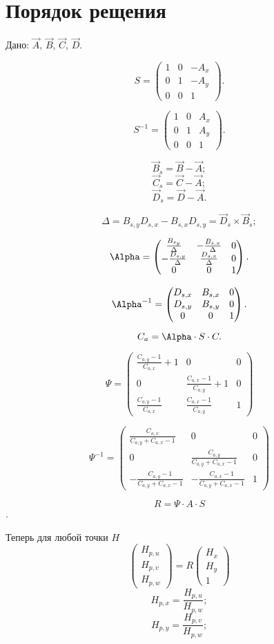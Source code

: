 \section{Порядок рещения}

Дано: $\vec A$, $\vec B$, $\vec C$, $\vec D$.

$$S = \begin{pmatrix}
	1 & 0 & -A_x \\
	0 & 1 & -A_y \\
	0 & 0 & 1
\end{pmatrix}.$$

$$S^{-1} = \begin{pmatrix}
	1 & 0 & A_x \\
	0 & 1 & A_y \\
	0 & 0 & 1
\end{pmatrix}.$$

$$\vec B_s = \vec B - \vec A;$$
$$\vec C_s = \vec C - \vec A;$$
$$\vec D_s = \vec D - \vec A.$$

$$ \Delta = B_{s,y} D_{s,x}-B_{s,x} D_{s,y} = \vec D_s \times \vec B_s;$$

$$	\Alpha = 
	\begin{pmatrix}
		\frac{B_{s_y}}{\Delta} & -\frac{B_{s,x}}{\Delta} & 0 \\
		-\frac{D_{s,y}}{\Delta} & \frac{D_{s,x}}{\Delta} & 0 \\
		0 & 0 & 1
	\end{pmatrix}.
$$

$$ \Alpha^{-1} =
\begin{pmatrix}
	D_{s,x} & B_{s,x} & 0 \\
	D_{s,y} & B_{s,y} & 0 \\
	0 & 0 & 1
\end{pmatrix}.
$$

$$C_a = \Alpha \cdot S \cdot C.$$

$$\Psi = 
\begin{pmatrix}
	\frac{C_{a,y}-1}{C_{a,x}} + 1 & 0 & 0 \\
	0 & \frac{C_{a,x}-1}{C_{a,y}}+1 & 0 \\
	\frac{C_{a,y}-1}{C_{a,x}} & \frac{C_{a,x}-1}{C_{a,y}} & 1
\end{pmatrix}
$$

$$\Psi^{-1} =
\begin{pmatrix}
	\frac{C_{a,x}}{C_{a,y}+C_{a,x}-1} & 0 & 0\\
	0 & \frac{C_{a,y}}{C_{a,y}+C_{a,x}-1} & 0\\
	-\frac{C_{a,y}-1}{C_{a,y}+C_{a,x}-1} & -\frac{C_{a,x}-1}{C_{a,y}+C_{a,x}-1} & 1
\end{pmatrix}
$$

$$R = \Psi \cdot A \cdot S $$.

Теперь для любой точки $H$
$$\begin{pmatrix}
	H_{p,u}\\
	H_{p,v}\\
	H_{p,w}
\end{pmatrix}
= R
\begin{pmatrix}
	H_{x}\\
	H_{y}\\
	1
\end{pmatrix}
$$
$$H_{p,x} = \frac{H_{p,u}}{H_{p,w}};$$
$$H_{p,y} = \frac{H_{p,v}}{H_{p,w}};$$